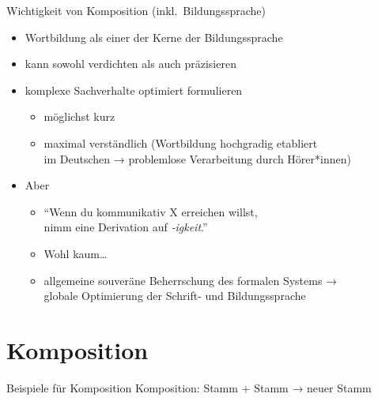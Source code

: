 \begin{frame}
  {Wichtigkeit von Komposition (inkl.\ Bildungssprache)}
  \pause
  \begin{itemize}[<+->]
    \item Wortbildung als einer der Kerne der Bildungssprache
    \item kann sowohl \alert{verdichten} als auch \alert{präzisieren}
    \Halbzeile
    \item komplexe Sachverhalte \alert{optimiert} formulieren
      \begin{itemize}[<+->]
        \item möglichst kurz
        \item maximal verständlich (Wortbildung hochgradig etabliert\\
          im Deutschen → problemlose Verarbeitung durch Hörer*innen)
      \end{itemize}
      \Halbzeile
    \item Aber 
      \Halbzeile
      \begin{itemize}[<+->]
        \item "`Wenn du kommunikativ X erreichen willst,\\
          nimm eine Derivation auf \textit{-igkeit}."'
        \item \alert{Wohl kaum\ldots}
        \item \alert{allgemeine souveräne Beherrschung des formalen Systems →\\
          globale Optimierung der Schrift- und Bildungssprache}
      \end{itemize}
  \end{itemize}
\end{frame}

\section{Komposition}

\begin{frame}
  {Beispiele für Komposition}
  \pause
  Komposition: \alert{Stamm + Stamm → neuer Stamm}
  \Halbzeile
  \pause
  \begin{exe}
    \ex
    \begin{xlist}
      \pause
      \pause
      \pause
      \pause
      \pause
      \pause
      \pause
      \pause
    \end{xlist}
  \end{exe}
\end{frame}

